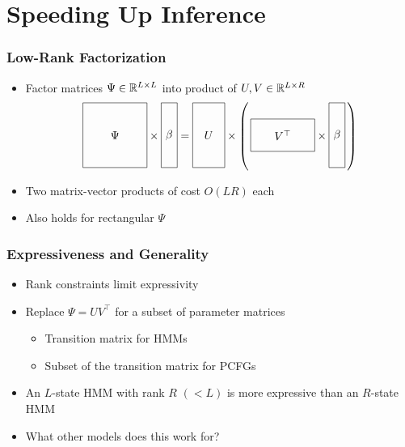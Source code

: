 \documentclass{beamer}
\begin{document}
\section{Speeding Up Inference}

\begin{frame}
\frametitle{Low-Rank Factorization}
\begin{itemize}
\item Factor matrices $\Psi\in\mathbb{R}^{L\times L}$ into product of $U,V\in\mathbb{R}^{L \times R}$
\[
\vcenter{\hbox{\begin{tikzpicture}[baseline=-0.5ex]
    \draw (0,0) rectangle (2,2) node[pos=.5] {$\Psi$};
\end{tikzpicture}}}
\times
\vcenter{\hbox{\begin{tikzpicture}[baseline=-0.5ex]
    \draw (0,0) rectangle (.5,2) node[pos=.5] {$\beta$};
\end{tikzpicture}}}
=
\vcenter{\hbox{\begin{tikzpicture}[baseline=-0.5ex]
    \draw (0,0) rectangle (1,2) node[pos=.5] {$U$};
\end{tikzpicture}}}
\times
\left(\,
\vcenter{\hbox{\begin{tikzpicture}[baseline=-0.5ex]
    \draw (0,0) rectangle (2,1) node[pos=.5] {$V^\top$};
\end{tikzpicture}}}
\times
\vcenter{\hbox{\begin{tikzpicture}[baseline=-0.5ex]
    \draw (0,0) rectangle (.5,2) node[pos=.5] {$\beta$};
\end{tikzpicture}}}
\,\right)
\]
\item Two matrix-vector products of cost $O(LR)$ each
\vspace{1em}
\item Also holds for rectangular $\Psi$
\end{itemize}
\end{frame}

\begin{frame}
\frametitle{Expressiveness and Generality}
\begin{itemize}
\item Rank constraints limit expressivity
\vspace{1em}
\item Replace $\Psi = UV^\top$ for a subset of parameter matrices
\vspace{1em}
    \begin{itemize}
    \item Transition matrix for HMMs
    \vspace{1em}
    \item Subset of the transition matrix for PCFGs
    \end{itemize}
\vspace{1em}
\item An $L$-state HMM with rank $R$ $(< L)$ is more
    expressive than an $R$-state HMM
\vspace{1em}
\item What other models does this work for?
\end{itemize}
\end{frame}
\end{document}
